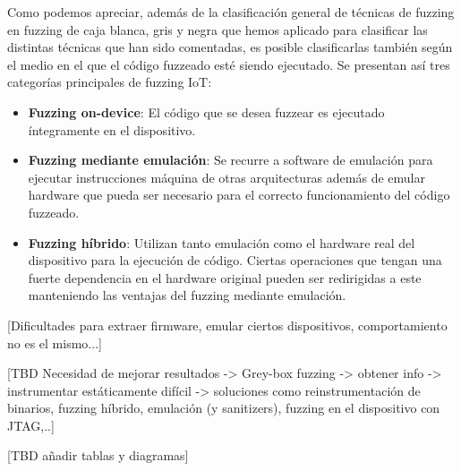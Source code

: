 Como podemos apreciar, además de la clasificación general de técnicas de fuzzing en fuzzing de caja blanca, gris y negra que hemos aplicado para clasificar las 
distintas técnicas que han sido comentadas, es posible clasificarlas también según el medio en el que el código fuzzeado esté siendo ejecutado. Se presentan así 
tres categorías principales de fuzzing IoT:
\begin{itemize}
    \item \textbf{Fuzzing on-device}: El código que se desea fuzzear es ejecutado íntegramente en el dispositivo.
    \item \textbf{Fuzzing mediante emulación}: Se recurre a software de emulación para ejecutar instrucciones máquina de otras arquitecturas además de 
    emular hardware que pueda ser necesario para el correcto funcionamiento del código fuzzeado.
    \item \textbf{Fuzzing híbrido}: Utilizan tanto emulación como el hardware real del dispositivo para la ejecución de código. Ciertas operaciones que 
    tengan una fuerte dependencia en el hardware original pueden ser redirigidas a este manteniendo las ventajas del fuzzing mediante emulación.
\end{itemize}

[Dificultades para extraer firmware, emular ciertos dispositivos, comportamiento no es el mismo...]

[TBD Necesidad de mejorar resultados -> Grey-box fuzzing -> obtener info -> instrumentar estáticamente difícil -> soluciones como 
reinstrumentación de binarios, fuzzing híbrido, emulación (y sanitizers), fuzzing en el dispositivo con JTAG,..]

[TBD añadir tablas y diagramas]